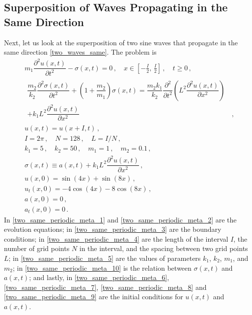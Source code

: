 \documentclass[11pt,a4paper,oneside,openright]{report} %
\begin{document}
\subsection{Superposition of Waves Propagating in the Same Direction}
\noindent
Next, let us look at the superposition of two sine waves that propagate in the same direction \eqref{two_waves_same}. The problem is
\begin{subequations}\label{}
    \begin{align}
        & m_1 \dfrac{\partial^2 u(x,t)}{\partial t^2} - \sigma(x,t)  = 0 \, , \quad x \in \left[- \frac{I}{2}, \, \frac{I}{2} \right] \, , \quad t \geq 0 \, , \label{two_same_periodic_meta_1} \\[5pt]
        & \begin{aligned}
            \dfrac{m_2}{k_2} \dfrac{\partial^2 \sigma(x,t)}{\partial t^2}  + \left(1 + \dfrac{m_2}{m_1} \right) \sigma(x,t) = \dfrac{m_2 k_1}{k_2} \dfrac{\partial^2 }{\partial t^2 } \left(L^2 \dfrac{\partial^2 u(x,t)}{\partial x^2} \right) & \\ + k_1 L^2 \dfrac{\partial^2 u(x,t)}{\partial x^2} & \, ,
        \end{aligned} \label{two_same_periodic_meta_2} \\[5pt]
        & u(x, t) = u(x + I, t) \, , \label{two_same_periodic_meta_3} \\[5pt]
        & I = 2\pi \, , \quad N = 128 \, , \quad L = I/N \, , \label{two_same_periodic_meta_4} \\[5pt]
        & k_1 = 5 \, , \quad k_2 = 50 \, , \quad m_1 = 1 \, , \quad m_2 = 0.1 \, , \label{two_same_periodic_meta_5} \\[5pt]
        & \sigma(x,t) \equiv a(x,t) + k_1 L^2 \dfrac{\partial^2 u(x,t)}{\partial x^2} \, , \label{two_same_periodic_meta_10} \\[5pt]
        & u(x,0) = \sin{(4 x)} + \sin{(8 x)} \, , \label{two_same_periodic_meta_6} \\[5pt]
        & u_t(x,0) =  - 4 \cos{(4x)} - 8 \cos{(8x)} \, , \label{two_same_periodic_meta_7} \\[5pt]
        & a(x,0) = 0 \, , \label{two_same_periodic_meta_8} \\[5pt]
        & a_t(x,0) = 0 \, \label{two_same_periodic_meta_9} .
    \end{align}
\end{subequations}
In \eqref{two_same_periodic_meta_1} and \eqref{two_same_periodic_meta_2} are the evolution equations; in \eqref{two_same_periodic_meta_3} are the boundary conditions; in \eqref{two_same_periodic_meta_4} are the length of the interval $I$, the number of grid points $N$ in the interval, and the spacing between two grid points $L$; in \eqref{two_same_periodic_meta_5} are the values of parameters $k_1$, $k_2$, $m_1$, and $m_2$; in \eqref{two_same_periodic_meta_10} is the relation between $\sigma(x,t)$ and $a(x,t)$; and lastly, in \eqref{two_same_periodic_meta_6}, \eqref{two_same_periodic_meta_7}, \eqref{two_same_periodic_meta_8} and \eqref{two_same_periodic_meta_9} are the initial conditions for $u(x,t)$ and~$a(x,t)$.
\end{document}
